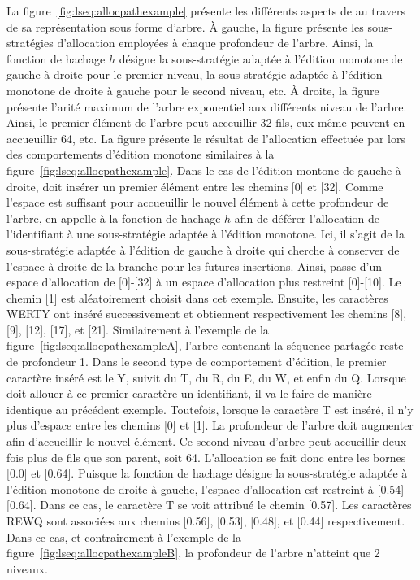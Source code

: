 La figure~\ref{fig:lseq:allocpathexample} présente les différents aspects de
\LSEQ au travers de sa représentation sous forme d'arbre. À gauche, la figure
présente les sous-stratégies d'allocation employées à chaque profondeur de
l'arbre. Ainsi, la fonction de hachage $h$ désigne la sous-stratégie adaptée à
l'édition monotone de gauche à droite pour le premier niveau, la sous-stratégie
adaptée à l'édition monotone de droite à gauche pour le second niveau, etc. À
droite, la figure présente l'arité maximum de l'arbre exponentiel aux différents
niveau de l'arbre. Ainsi, le premier élément de l'arbre peut acceuillir 32 fils,
eux-même peuvent en accueuillir 64, etc. La figure présente le résultat de
l'allocation effectuée par \LSEQ lors des comportements d'édition monotone
similaires à la figure~\ref{fig:lseq:allocpathexample}. Dans le cas de l'édition
montone de gauche à droite, \LSEQ doit insérer un premier élément entre les
chemins [0] et [32]. Comme l'espace est suffisant pour accueuillir le nouvel
élément à cette profondeur de l'arbre, \LSEQ en appelle à la fonction de hachage
$h$ afin de déférer l'allocation de l'identifiant à une sous-stratégie adaptée à
l'édition monotone. Ici, il s'agit de la sous-stratégie adaptée à l'édition de
gauche à droite qui cherche à conserver de l'espace à droite de la branche pour
les futures insertions. Ainsi, \LSEQ passe d'un espace d'allocation de [0]-[32]
à un espace d'allocation plus restreint [0]-[10]. Le chemin [1] est
aléatoirement choisit dans cet exemple. Ensuite, les caractères WERTY ont inséré
successivement et obtiennent respectivement les chemins [8], [9], [12], [17], et
[21]. Similairement à l'exemple de la figure~\ref{fig:lseq:allocpathexampleA},
l'arbre contenant la séquence partagée reste de profondeur 1. Dans le second
type de comportement d'édition, le premier caractère inséré est le Y, suivit du
T, du R, du E, du W, et enfin du Q. Lorsque \LSEQ doit allouer à ce premier
caractère un identifiant, il va le faire de manière identique au précédent
exemple. Toutefois, lorsque le caractère T est inséré, il n'y plus d'espace
entre les chemins [0] et [1]. La profondeur de l'arbre doit augmenter afin
d'accueillir le nouvel élément. Ce second niveau d'arbre peut accueillir deux
fois plus de fils que son parent, soit 64. L'allocation se fait donc entre les
bornes [0.0] et [0.64]. Puisque la fonction de hachage désigne la sous-stratégie
adaptée à l'édition monotone de droite à gauche, l'espace d'allocation est
restreint à [0.54]-[0.64]. Dans ce cas, le caractère T se voit attribué le
chemin [0.57]. Les caractères REWQ sont associées aux chemins [0.56], [0.53],
[0.48], et [0.44] respectivement. Dans ce cas, et contrairement à l'exemple de
la figure~\ref{fig:lseq:allocpathexampleB}, la profondeur de l'arbre n'atteint
que 2 niveaux.

%   


